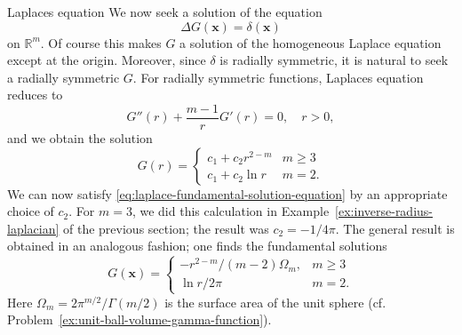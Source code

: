\begin{Example}{Laplace\textquotesingle s equation}
\label{ex:laplace-fundamental-solution}
We now seek a solution of the equation
\begin{equation}\label{eq:laplace-fundamental-solution-equation}
\Delta G(\bm{x})=\delta(\bm{x})
\end{equation}
on $\mathbb{R}^m$. Of course this makes $G$ a solution of the homogeneous Laplace equation except at the origin. Moreover, since $\delta$ is radially symmetric, it is natural to seek a radially symmetric $G$. For radially symmetric functions, Laplace\textquotesingle s equation reduces to
\begin{equation}\label{eq:laplace-radial-fundamental-ode}
G''(r)+\dfrac{m-1}rG'(r)=0,\quad r>0,
\end{equation}
and we obtain the solution
\begin{equation}\label{eq:laplace-radial-homogeneous-solutions}
G(r)=\begin{cases}c_1+c_2r^{2-m}&m\geq3\\c_1+c_2\ln r&m=2.\end{cases}
\end{equation}
We can now satisfy \eqref{eq:laplace-fundamental-solution-equation} by an appropriate choice of $c_2$. For $m=3$, we did this calculation in Example~\ref{ex:inverse-radius-laplacian} of the previous section; the result was $c_2=-1/4\pi$. The general result is obtained in an analogous fashion; one finds the fundamental solutions
\begin{equation}\label{eq:laplace-fundamental-solution-all-dimensions}
G(\bm{x})=\begin{cases}-r^{2-m}/(m-2)\Omega_m,&m\geq3\\\ln r/2\pi&m=2.\end{cases}
\end{equation}
Here $\Omega_m=2\pi^{m/2}/\Gamma(m/2)$ is the surface area of the unit sphere (cf. Problem~\ref{ex:unit-ball-volume-gamma-function}).
\end{Example}
